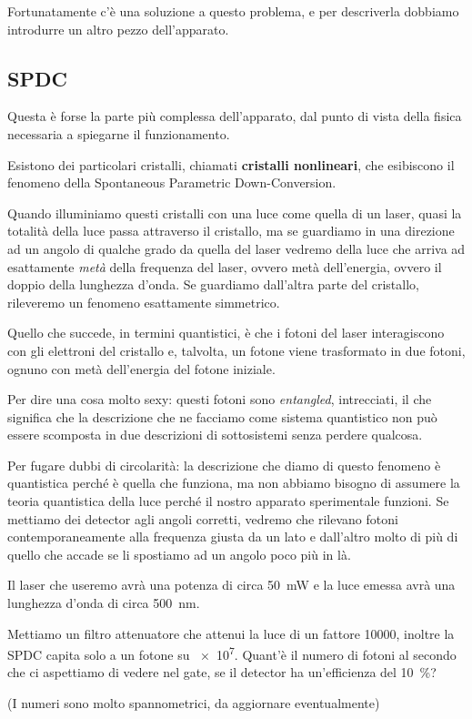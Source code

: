 \documentclass[a4paper,12pt]{article}
\begin{document}
Fortunatamente c'è una soluzione a questo problema, e per descriverla dobbiamo introdurre un altro pezzo dell'apparato.

\subsection{SPDC}

Questa è forse la parte più complessa dell'apparato, dal punto di vista della fisica necessaria a spiegarne il funzionamento.

Esistono dei particolari cristalli, chiamati \textbf{cristalli nonlineari}, che esibiscono il fenomeno della Spontaneous Parametric Down-Conversion.

Quando illuminiamo questi cristalli con una luce come quella di un laser, quasi la totalità della luce passa attraverso il cristallo, ma se guardiamo in una direzione ad un angolo di qualche grado da quella del laser vedremo della luce che arriva ad esattamente \emph{metà} della frequenza del laser, ovvero metà dell'energia, ovvero il doppio della lunghezza d'onda. 
Se guardiamo dall'altra parte del cristallo, rileveremo un fenomeno esattamente simmetrico.

Quello che succede, in termini quantistici, è che i fotoni del laser interagiscono con gli elettroni del cristallo e, talvolta, un fotone viene trasformato in due fotoni, ognuno con metà dell'energia del fotone iniziale.

Per dire una cosa molto sexy: questi fotoni sono \emph{entangled}, intrecciati, il che significa che la descrizione che ne facciamo come sistema quantistico non può essere scomposta in due descrizioni di sottosistemi senza perdere qualcosa. 

Per fugare dubbi di circolarità: la descrizione che diamo di questo fenomeno è quantistica perché è quella che funziona, ma non abbiamo bisogno di assumere la teoria quantistica della luce perché il nostro apparato sperimentale funzioni.
Se mettiamo dei detector agli angoli corretti, vedremo che rilevano fotoni contemporaneamente alla frequenza giusta da un lato e dall'altro molto di più di quello che accade se li spostiamo ad un angolo poco più in là. 

\begin{exo}
Il laser che useremo avrà una potenza di circa \SI{50}{mW} e la luce emessa avrà una lunghezza d'onda di circa \SI{500}{nm}. 

Mettiamo un filtro attenuatore che attenui la luce di un fattore 10000, inoltre la SPDC capita solo a un fotone su \num{e7}. Quant'è il numero di fotoni al secondo che ci aspettiamo di vedere nel gate, se il detector ha un'efficienza del \SI{10}{\percent}?

(I numeri sono molto spannometrici, da aggiornare eventualmente)
\end{exo}
\end{document}
